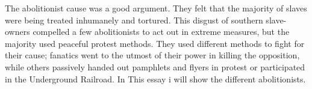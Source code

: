\documentclass[a4paper]{article}
\begin{document}
%
%
%


The abolitionist cause was a good argument. They felt that the majority of slaves were being treated inhumanely and tortured. This disgust of southern slave-owners compelled a few abolitionists to act out in extreme measures, but the majority used peaceful protest methods. They used different methods to fight for their cause; fanatics went to the utmost of their power in killing the opposition, while others passively handed out pamphlets and flyers in protest or participated in the Underground Railroad. In This essay i will show the different abolitionists.
%
%
%
\end{document}
